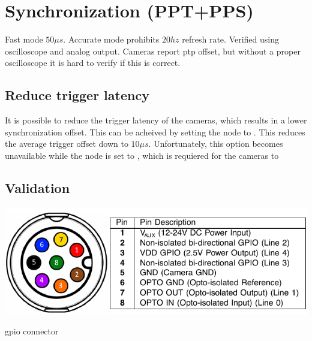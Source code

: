 \section{Synchronization (PPT+PPS)}
Fast mode \approx $50\mu s$. Accurate mode prohibits $20hz$ refresh rate.
Verified using oscilloscope and analog output.
Cameras report ptp offset, but without a proper oscilloscope it is hard to verify if this is correct.

\subsection{Reduce trigger latency}
It is possible to reduce the trigger latency of the cameras, which results in a lower synchronization offset.
This can be acheived by setting the  node to .
This reduces the average trigger offset down to $10\mu s$.
Unfortunately, this option becomes unavailable while the  node is set to , which is requiered for the cameras to


\subsection{Validation}
\begin{table}[H]
    \centering
    \includegraphics[width=\textwidth]{figures/triton_pinout.pdf}
    \caption{\cam \gls{gpio} connector \cite{lucidvisionlabsTritonMPPolarized2020}}
\end{table}


